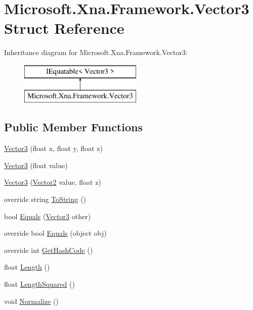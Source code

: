 \hypertarget{struct_microsoft_1_1_xna_1_1_framework_1_1_vector3}{}\section{Microsoft.\+Xna.\+Framework.\+Vector3 Struct Reference}
\label{struct_microsoft_1_1_xna_1_1_framework_1_1_vector3}
Inheritance diagram for Microsoft.\+Xna.\+Framework.\+Vector3\+:\begin{figure}[H]
\begin{center}
\leavevmode
\includegraphics[height=2.000000cm]{struct_microsoft_1_1_xna_1_1_framework_1_1_vector3}
\end{center}
\end{figure}
\subsection*{Public Member Functions}
\begin{DoxyCompactItemize}
\item 
\hyperlink{struct_microsoft_1_1_xna_1_1_framework_1_1_vector3_abaddc009e6e96bac2db7c799ee622fad}{Vector3} (float x, float y, float z)
\item 
\hyperlink{struct_microsoft_1_1_xna_1_1_framework_1_1_vector3_a03097584620693418cb761b3ea9670cc}{Vector3} (float value)
\item 
\hyperlink{struct_microsoft_1_1_xna_1_1_framework_1_1_vector3_a3a4d8abde385379d67de69e04c25452b}{Vector3} (\hyperlink{struct_microsoft_1_1_xna_1_1_framework_1_1_vector2}{Vector2} value, float z)
\item 
override string \hyperlink{struct_microsoft_1_1_xna_1_1_framework_1_1_vector3_a92309dde331635ce2abe77ccacb90db2}{To\+String} ()
\item 
bool \hyperlink{struct_microsoft_1_1_xna_1_1_framework_1_1_vector3_a656fb934df2623ef293e346304a3892a}{Equals} (\hyperlink{struct_microsoft_1_1_xna_1_1_framework_1_1_vector3}{Vector3} other)
\item 
override bool \hyperlink{struct_microsoft_1_1_xna_1_1_framework_1_1_vector3_a9d7f95f9c834da9287b91e5253b66aff}{Equals} (object obj)
\item 
override int \hyperlink{struct_microsoft_1_1_xna_1_1_framework_1_1_vector3_abeabe4a6ed09f450baadb58932f2f890}{Get\+Hash\+Code} ()
\item 
float \hyperlink{struct_microsoft_1_1_xna_1_1_framework_1_1_vector3_ae9016101cab413638634d94212965bce}{Length} ()
\item 
float \hyperlink{struct_microsoft_1_1_xna_1_1_framework_1_1_vector3_a806effb79a20edf2cf1702418ffc4795}{Length\+Squared} ()
\item 
void \hyperlink{struct_microsoft_1_1_xna_1_1_framework_1_1_vector3_a27dd9dddb78d353b191e63bff7d414e3}{Normalize} ()
\end{DoxyCompactItemize}
